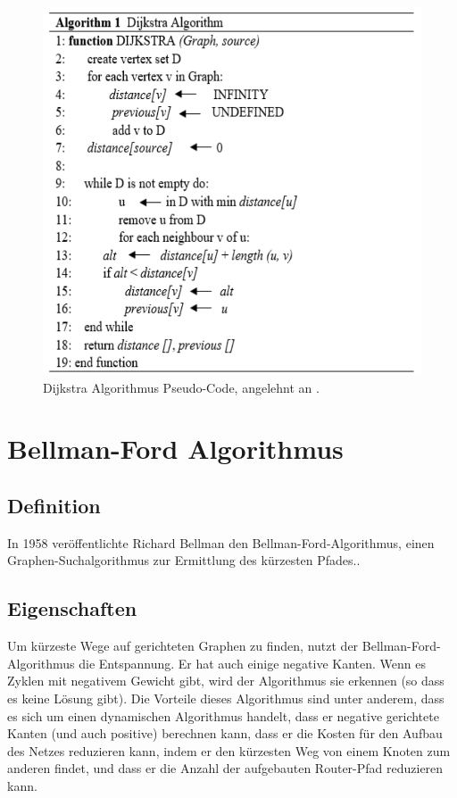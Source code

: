 \begin{figure}[H]
	\centering
	\includegraphics[width=1.0\textwidth]{images/Dijkstra_pseudoCode.PNG}
	\caption{Dijkstra Algorithmus Pseudo-Code, angelehnt an \cite{Abusalim2020}.}
	\label{fig:Dijkstra Pseudo-Code}
\end{figure}




\section{Bellman-Ford Algorithmus}
\label{Bellman-Ford-Algorithmus}
\subsection{Definition}

In 1958 veröffentlichte Richard Bellman den Bellman-Ford-Algorithmus, einen Graphen-Suchalgorithmus zur Ermittlung des kürzesten Pfades.\cite{Abusalim2020,Sulaiman18}.
\subsection{Eigenschaften}
Um kürzeste Wege auf gerichteten Graphen zu finden, nutzt der Bellman-Ford-Algorithmus die Entspannung. Er hat auch einige negative Kanten. Wenn es Zyklen mit negativem Gewicht gibt, wird der Algorithmus sie erkennen (so dass es keine Lösung gibt)\cite{Vaibhavi2014}.
\newline
Die Vorteile dieses Algorithmus sind unter anderem, dass es sich um einen dynamischen Algorithmus handelt, dass er negative gerichtete Kanten (und auch positive) berechnen kann, dass er die Kosten für den Aufbau des Netzes reduzieren kann, indem er den kürzesten Weg von einem Knoten zum anderen findet, und dass er die Anzahl der aufgebauten Router-Pfad reduzieren kann\cite{Abusalim2020}.


